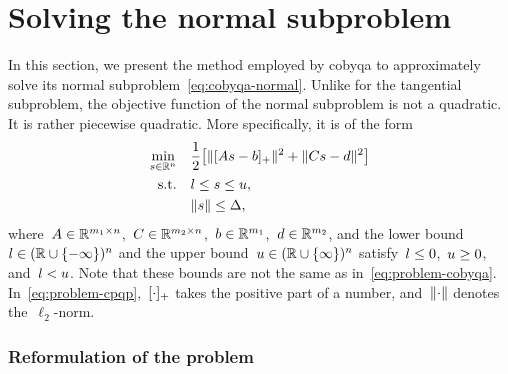 \section{Solving the normal subproblem}
\label{sec:cobyqa-normal}

In this section, we present the method employed by \gls{cobyqa} to approximately solve its normal subproblem~\cref{eq:cobyqa-normal}.
Unlike for the tangential subproblem, the objective function of the normal subproblem is not a quadratic.
It is rather piecewise quadratic.
More specifically, it is of the form
\begin{subequations}
    \label{eq:problem-cpqp}
    \begin{align}
        \min_{\sstep \in \R^n}  & \quad \frac{1}{2} \big[ \norm{\posp{A \sstep - b}}^2 + \norm{C \sstep - d}^2 \big]\\
        \text{s.t.}             & \quad \xl \le \sstep \le \xu,\\
                                & \quad \norm{\sstep} \le \rad,
    \end{align}
\end{subequations}
where~$A \in \mathbb{R}^{m_1 \times n}$,~$C \in \mathbb{R}^{m_2 \times n}$,~$b \in \mathbb{R}^{m_1}$,~$d \in \mathbb{R}^{m_2}$, and the lower bound~$l \in (\mathbb{R} \cup \{-\infty\})^n$ and the upper bound~$u \in (\mathbb{R} \cup \{\infty\})^n$ satisfy~$l \le 0$,~$u \ge 0$, and~$l < u$.
Note that these bounds are not the same as in~\cref{eq:problem-cobyqa}.
In~\cref{eq:problem-cpqp},~$[\cdot]_+$ takes the positive part of a number, and~$\lVert\cdot\rVert$ denotes the~$\ell_2$-norm.

\subsubsection{Reformulation of the problem}

